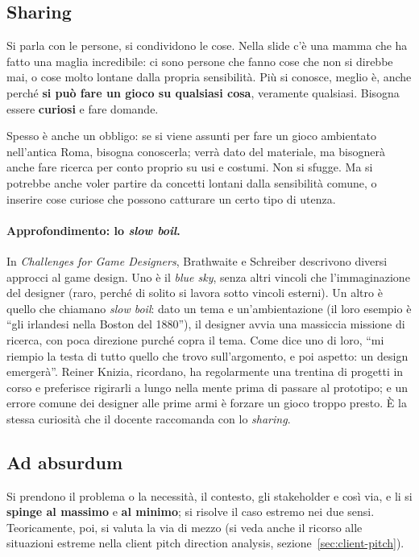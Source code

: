 \subsection{Sharing}

Si parla con le persone, si condividono le cose. Nella slide c'è una mamma che
ha fatto una maglia incredibile: ci sono persone che fanno cose che non si
direbbe mai, o cose molto lontane dalla propria sensibilità. Più si conosce,
meglio è, anche perché \textbf{si può fare un gioco su qualsiasi cosa},
veramente qualsiasi. Bisogna essere \textbf{curiosi} e fare domande.

Spesso è anche un obbligo: se si viene assunti per fare un gioco ambientato
nell'antica Roma, bisogna conoscerla; verrà dato del materiale, ma bisognerà
anche fare ricerca per conto proprio su usi e costumi. Non si sfugge. Ma si
potrebbe anche voler partire da concetti lontani dalla sensibilità comune, o
inserire cose curiose che possono catturare un certo tipo di utenza.

\paragraph{Approfondimento: lo \emph{slow boil}.} In \emph{Challenges for Game
Designers}, Brathwaite e Schreiber descrivono diversi approcci al game design.
Uno è il \emph{blue sky}, senza altri vincoli che l'immaginazione del
designer (raro, perché di solito si lavora sotto vincoli esterni). Un altro è
quello che chiamano \emph{slow boil}: dato un tema e un'ambientazione (il loro
esempio è ``gli irlandesi nella Boston del 1880''), il designer avvia una
massiccia missione di ricerca, con poca direzione purché copra il tema. Come
dice uno di loro, ``mi riempio la testa di tutto quello che trovo
sull'argomento, e poi aspetto: un design emergerà''. Reiner Knizia, ricordano,
ha regolarmente una trentina di progetti in corso e preferisce rigirarli a
lungo nella mente prima di passare al prototipo; e un errore comune dei
designer alle prime armi è forzare un gioco troppo presto. È la stessa
curiosità che il docente raccomanda con lo \emph{sharing}.

\subsection{Ad absurdum}

Si prendono il problema o la necessità, il contesto, gli stakeholder e così
via, e li si \textbf{spinge al massimo} e \textbf{al minimo}; si risolve il
caso estremo nei due sensi. Teoricamente, poi, si valuta la via di mezzo (si
veda anche il ricorso alle situazioni estreme nella client pitch direction
analysis, sezione~\ref{sec:client-pitch}).

